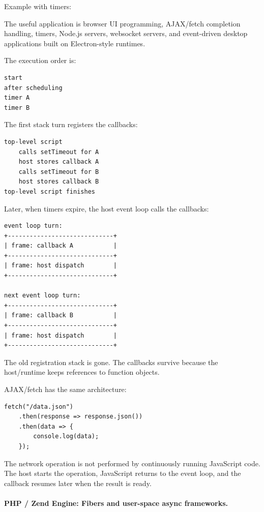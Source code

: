 Example with timers:

The useful application is browser UI programming, AJAX/fetch completion handling, timers, Node.js servers, websocket servers, and event-driven desktop applications built on Electron-style runtimes.

The execution order is:

\begin{verbatim}
start
after scheduling
timer A
timer B
\end{verbatim}

The first stack turn registers the callbacks:

\begin{verbatim}
top-level script
    calls setTimeout for A
    host stores callback A
    calls setTimeout for B
    host stores callback B
top-level script finishes
\end{verbatim}

Later, when timers expire, the host event loop calls the callbacks:

\begin{verbatim}
event loop turn:
+-----------------------------+
| frame: callback A           |
+-----------------------------+
| frame: host dispatch        |
+-----------------------------+

next event loop turn:
+-----------------------------+
| frame: callback B           |
+-----------------------------+
| frame: host dispatch        |
+-----------------------------+
\end{verbatim}

The old registration stack is gone. The callbacks survive because the host/runtime keeps references to function objects.

AJAX/fetch has the same architecture:

\begin{verbatim}
fetch("/data.json")
    .then(response => response.json())
    .then(data => {
        console.log(data);
    });
\end{verbatim}

The network operation is not performed by continuously running JavaScript code. The host starts the operation, JavaScript returns to the event loop, and the callback resumes later when the result is ready.

\paragraph{PHP / Zend Engine: Fibers and user-space async frameworks.}

